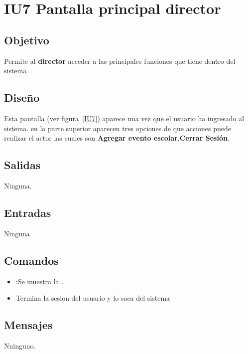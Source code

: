 \newpage
\section{IU7 Pantalla principal director}

\subsection{Objetivo}
	Permite al {\bf director} acceder a las principales funciones que tiene dentro del sistema

\subsection{Diseño}
	Esta pantalla  (ver figura~\ref{IU7}) aparece una vez que el usuario ha ingresado al sistema. 
 en la parte superior aparecen tres opciones de que acciones puede realizar el actor las cuales son {\bf Agregar evento escolar},{\bf Cerrar Sesión}. 

 

\subsection{Salidas}

	Ninguna.

\subsection{Entradas}
Ninguna

\subsection{Comandos}
\begin{itemize}
	\item {}:Se muestra la .
          \item {}Termina la sesion del usuario y lo saca del sistema
\end{itemize}

\subsection{Mensajes}

\begin{Citemize}
	\item Nninguno.
\end{Citemize}

